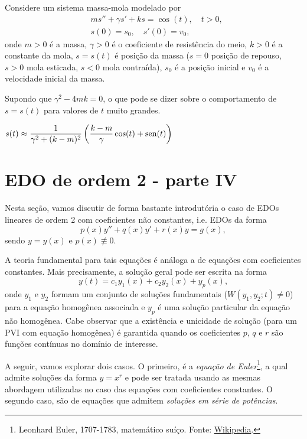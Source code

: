 \begin{exer}
  Considere um sistema massa-mola modelado por
  \begin{align}
    & ms'' + \gamma s' + ks = \cos(t),\quad t>0,\\
    & s(0) = s_0,\quad s'(0) = v_0,
  \end{align}
  onde $m>0$ é a massa, $\gamma>0$ é o coeficiente de resistência do meio, $k>0$ é a constante da mola, $s=s(t)$ é posição da massa ($s=0$ posição de repouso, $s>0$ mola esticada, $s<0$ mola contraída), $s_0$ é a posição inicial e $v_0$ é a velocidade inicial da massa.

  Supondo que $\gamma^2-4mk = 0$, o que pode se dizer sobre o comportamento de $s=s(t)$ para valores de $t$ muito grandes. 
\end{exer}
\begin{resp}
  $s(t) \approx \displaystyle \frac{1}{\gamma^2 + (k-m)^2}\left(\frac{k-m}{\gamma}\cos(t) + \operatorname{sen}(t)\right)$
\end{resp}

\section{EDO de ordem 2 - parte IV}\label{cap_edolin_sec_edo2IV}

Nesta seção, vamos discutir de forma bastante introdutória o caso de EDOs lineares de ordem 2 com coeficientes não constantes, i.e. EDOs da forma
\begin{equation}
  p(x)y'' + q(x)y' + r(x)y = g(x),
\end{equation}
sendo $y = y(x)$ e $p(x)\not\equiv 0$.

A teoria fundamental para tais equações é análoga a de equações com coeficientes constantes. Mais precisamente, a solução geral pode ser escrita na forma
\begin{equation}
  y(t) = c_1y_1(x) + c_2y_2(x) + y_p(x),
\end{equation}
onde $y_1$ e $y_2$ formam um conjunto de soluções fundamentais ($W(y_1,y_2;t)\neq 0$) para a equação homogênea associada e $y_p$ é uma solução particular da equação não homogênea. Cabe observar que a existência e unicidade de solução (para um PVI com equação homogênea) é garantida quando os coeficientes $p$, $q$ e $r$ são funções contínuas no domínio de interesse.

A seguir, vamos explorar dois casos. O primeiro, é a \emph{equação de Euler}\footnote{Leonhard Euler, 1707-1783, matemático suíço. Fonte: \href{https://en.wikipedia.org/wiki/Leonhard_Euler}{Wikipedia}.}, a qual admite soluções da forma $y = x^r$ e pode ser tratada usando as mesmas abordagem utilizadas no caso das equações com coeficientes constantes. O segundo caso, são de equações que admitem \emph{soluções em série de potências}.

